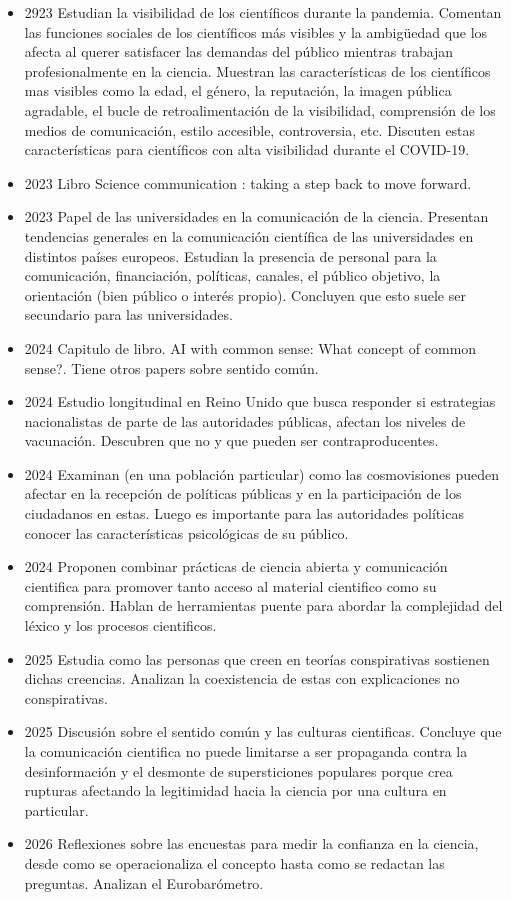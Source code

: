 \documentclass[11pt,                                                            
 superscriptaddress,twoside,
 amsmath,amssymb,
 aps, physrev
]{revtex4-2}
\begin{document}
\begin{itemize}
\begin{itemize}
		\item \cite{Joubert2023} 2923 Estudian la visibilidad de los científicos durante la pandemia. Comentan las funciones sociales de los científicos más visibles y la ambigüedad que los afecta al querer satisfacer las demandas del público mientras trabajan profesionalmente en la ciencia. Muestran las características de los científicos mas visibles como la edad, el género, la reputación, la imagen pública agradable, el bucle de retroalimentación de la visibilidad, comprensión de los medios de comunicación, estilo accesible, controversia, etc. Discuten estas características para científicos con alta visibilidad durante el COVID-19.
		\item 2023 Libro Science communication : taking a step back to move forward.
		\item \cite{Entradas2023} 2023 Papel de las universidades en la comunicación de la ciencia. Presentan tendencias generales en la comunicación científica de las universidades en  distintos países europeos. Estudian la presencia de personal para la comunicación, financiación, políticas, canales, el público objetivo, la orientación (bien público o interés propio). Concluyen que esto suele ser secundario para las universidades.
		\item 2024 Capitulo de libro. AI with common sense: What concept of common sense?. Tiene otros papers sobre sentido común.
		\item 2024 \cite{Ansell2024} Estudio longitudinal en Reino Unido que busca responder si estrategias nacionalistas de parte de las autoridades públicas, afectan los niveles de vacunación. Descubren que no y que pueden ser contraproducentes.
		\item 2024 \cite{Sammut2024} Examinan (en una población particular) como las cosmovisiones pueden afectar en la recepción de políticas públicas y en la participación de los ciudadanos en estas. Luego es importante para las autoridades políticas conocer las características psicológicas de su público.
		\item 2024 \cite{Oliveira2024} Proponen combinar prácticas de ciencia abierta y comunicación cientifica para promover tanto acceso al material cientifico como su comprensión. Hablan de herramientas puente para abordar la complejidad del léxico y los procesos cientificos. 
		\item 2025 \cite{Hall2025} Estudia como las personas que creen en teorías conspirativas sostienen dichas creencias. Analizan la coexistencia de estas con explicaciones no conspirativas.
		\item 2025 \cite{Bauer2025} Discusión sobre el sentido común y las culturas cientificas. Concluye que la comunicación cientifica no puede limitarse a ser propaganda contra la desinformación y el desmonte de supersticiones populares porque crea rupturas afectando la legitimidad hacia la ciencia por una cultura en particular.
		\item 2026 \cite{BehmBahtat2026} Reflexiones sobre las encuestas para medir la confianza en la ciencia, desde como se operacionaliza el concepto hasta como se redactan las preguntas. Analizan el Eurobarómetro. 
		

\end{itemize}
\end{itemize}
\end{document}
